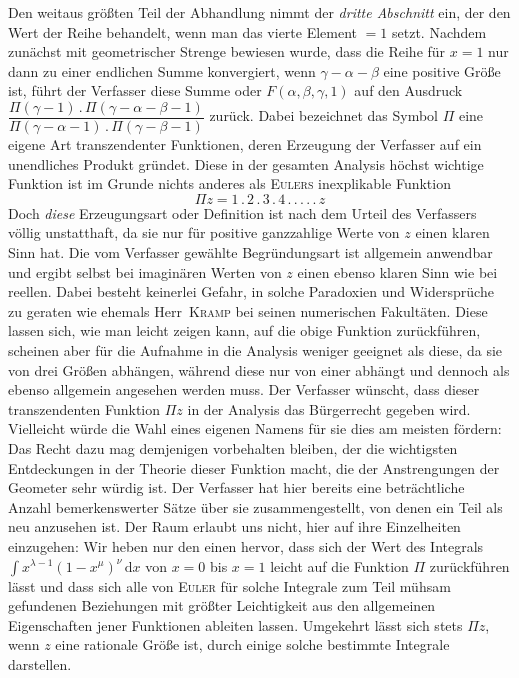 Den weitaus größten Teil der Abhandlung nimmt der \textit{dritte Abschnitt} ein, der den Wert der Reihe behandelt, wenn man das vierte Element $=1$ setzt. Nachdem zunächst mit geometrischer Strenge bewiesen wurde, dass die Reihe für $x=1$ nur dann zu einer endlichen Summe konvergiert, wenn $\gamma-\alpha-\beta$ eine positive Größe ist, führt der Verfasser diese Summe oder $F(\alpha,\beta,\gamma,1)$ auf den Ausdruck $\dfrac{\Pi(\gamma-1)\,.\,\Pi(\gamma-\alpha-\beta-1)}{\Pi(\gamma-\alpha-1)\,.\,\Pi(\gamma-\beta-1)}$ zurück. Dabei bezeichnet das Symbol $\Pi$ eine eigene Art transzendenter Funktionen, deren Erzeugung der Verfasser auf ein unendliches Produkt gründet. Diese in der gesamten Analysis höchst wichtige Funktion ist im Grunde nichts anderes als \textsc{Eulers} inexplikable Funktion
\[
\Pi z=1\,.\,2\,.\,3\,.\,4\,.\,.\,.\,.\,.\,z
\]
Doch \textit{diese} Erzeugungsart oder Definition ist nach dem Urteil des Verfassers völlig unstatthaft, da sie nur für positive ganzzahlige Werte von $z$ einen klaren Sinn hat. Die vom Verfasser gewählte Begründungsart ist allgemein anwendbar und ergibt selbst bei imaginären Werten von $z$ einen ebenso klaren Sinn wie bei reellen. Dabei besteht keinerlei Gefahr, in solche Paradoxien und Widersprüche zu geraten wie ehemals Herr\ \textsc{Kramp} bei seinen numerischen Fakultäten. Diese lassen sich, wie man leicht zeigen kann, auf die obige Funktion zurückführen, scheinen aber für die Aufnahme in die Analysis weniger geeignet als diese, da sie von drei Größen abhängen, während diese nur von einer abhängt und dennoch als ebenso allgemein angesehen werden muss. Der Verfasser wünscht, dass dieser transzendenten Funktion $\Pi z$ in der Analysis das Bürgerrecht gegeben wird. Vielleicht würde die Wahl eines eigenen Namens für sie dies am meisten fördern: Das Recht dazu mag demjenigen vorbehalten bleiben, der die wichtigsten Entdeckungen in der Theorie dieser Funktion macht, die der Anstrengungen der Geometer sehr würdig ist. Der Verfasser hat hier bereits eine beträchtliche Anzahl bemerkenswerter Sätze über sie zusammengestellt, von denen ein Teil als neu anzusehen ist. Der Raum erlaubt uns nicht, hier auf ihre Einzelheiten einzugehen: Wir heben nur den einen hervor, dass sich der Wert des Integrals $\int x^{\lambda-1}(1-x^\mu)^\nu\,\mathrm{d}x$ von $x=0$ bis $x=1$ leicht auf die Funktion $\Pi$ zurückführen lässt und dass sich alle von \textsc{Euler} für solche Integrale zum Teil mühsam gefundenen Beziehungen mit größter Leichtigkeit aus den allgemeinen Eigenschaften jener Funktionen ableiten lassen. Umgekehrt lässt sich stets $\Pi z$, wenn $z$ eine rationale Größe ist, durch einige solche bestimmte Integrale darstellen.

